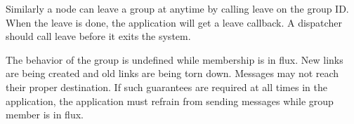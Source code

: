 \documentclass[a4paper,twoside]{report} %
\begin{document}
Similarly a node can leave a group at anytime by calling leave on the group ID.
When the leave is done, the application will get a leave callback.
A dispatcher should call leave before it exits the system.

The behavior of the group is undefined while membership is in flux.
New links are being created and old links are being torn down.
Messages may not reach their proper destination.
If such guarantees are required at all times in the application,
the application must refrain from sending messages while
group member is in flux.





\end{document}
